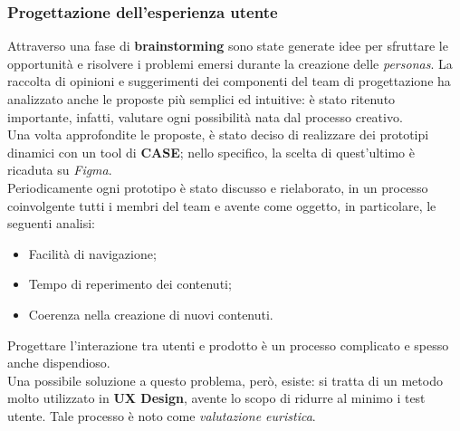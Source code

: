 \documentclass{natourDoc}
\begin{document}
\subsubsection{Progettazione dell'esperienza utente}
Attraverso una fase di \textbf{brainstorming} sono state generate idee per sfruttare le opportunità e risolvere i problemi emersi durante la creazione delle \textit{personas}.
La raccolta di opinioni e suggerimenti dei componenti del team di progettazione ha analizzato anche le proposte più semplici ed intuitive: è stato ritenuto importante, infatti, valutare ogni 
possibilità nata dal processo creativo. \\
Una volta approfondite le proposte, è stato deciso di realizzare dei prototipi dinamici con un tool di \textbf{CASE}; nello specifico, la scelta di quest'ultimo è ricaduta su \textit{Figma}.\\

Periodicamente ogni prototipo è stato discusso e rielaborato, in un processo coinvolgente tutti i membri del team e avente come oggetto, in particolare, le seguenti analisi:
\begin{itemize}
	\item Facilità di navigazione;
	\item Tempo di reperimento dei contenuti;
	\item Coerenza nella creazione di nuovi contenuti.
\end{itemize}

Progettare l'interazione tra utenti e prodotto è un processo complicato e spesso anche dispendioso. \\
Una possibile soluzione a questo problema, però, esiste: si tratta di un metodo molto utilizzato in 
\textbf{UX Design}, avente lo scopo di ridurre al minimo i test utente. Tale processo è noto come \textit{valutazione euristica}. \\
\end{document}
